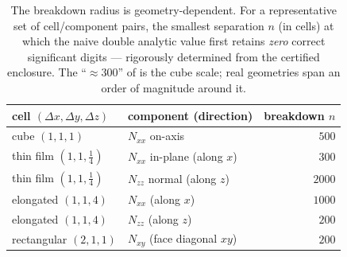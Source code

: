 \documentclass[11pt]{amsart}
\theoremstyle{plain}
\theoremstyle{definition}
\theoremstyle{remark}
\begin{document}
\begin{table}[h]
\centering
\caption{The breakdown radius is geometry-dependent. For a representative set of
cell/component pairs, the smallest separation $n$ (in cells) at which the naive
double analytic value first retains \emph{zero} correct significant digits ---
rigorously determined from the certified enclosure. The ``$\approx 300$'' of
\cite{CF2015} is the cube scale; real geometries span an order of magnitude
around it.}
\label{tab:breakdown}
\begin{tabular}{l l r}
\toprule
cell $(\Delta x,\Delta y,\Delta z)$ & component (direction) & breakdown $n$ \\
\midrule
cube $(1,1,1)$          & $N_{xx}$ on-axis                 & $500$ \\
thin film $(1,1,\tfrac14)$ & $N_{xx}$ in-plane (along $x$) & $300$ \\
thin film $(1,1,\tfrac14)$ & $N_{zz}$ normal (along $z$)   & $2000$ \\
elongated $(1,1,4)$     & $N_{xx}$ (along $x$)             & $1000$ \\
elongated $(1,1,4)$     & $N_{zz}$ (along $z$)             & $200$ \\
rectangular $(2,1,1)$   & $N_{xy}$ (face diagonal $xy$)    & $200$ \\
\bottomrule
\end{tabular}
\end{table}
\end{document}
